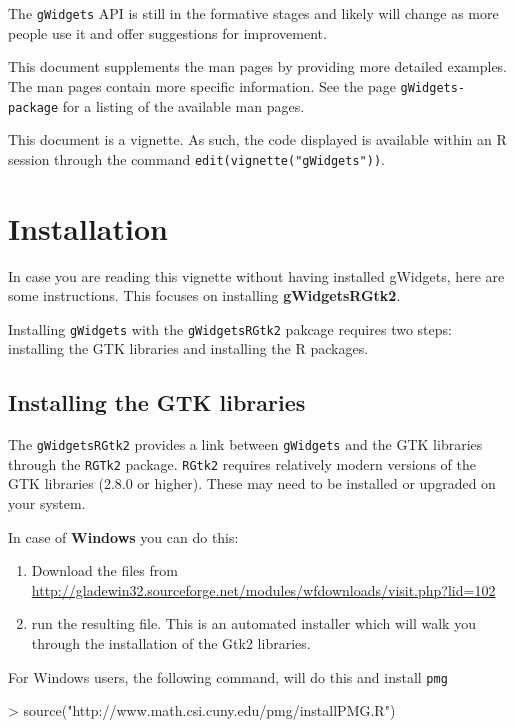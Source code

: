 \documentclass[12pt]{article}
\newcommand{\RCode}[1]{\texttt{#1}}
\newcommand{\RPackage}[1]{\textbf{#1}}
\begin{document}
The \RCode{gWidgets} API is still in the formative stages and likely will
change as more people use it and offer suggestions for improvement.

This document supplements the man pages by providing more detailed
examples. The man pages contain more specific information. See the 
page \RCode{gWidgets-package} for a listing of the available man pages.

This document is a vignette. As such, the code displayed is available
within an R session through the command
\RCode{edit(vignette("gWidgets"))}. 

\section{Installation}
In case you are reading this vignette without having installed
gWidgets, here are some instructions. This focuses on installing
\RPackage{gWidgetsRGtk2}. 

Installing \RCode{gWidgets} with the \RCode{gWidgetsRGtk2} pakcage
requires two steps: installing the GTK libraries and installing the R
packages.



\subsection{Installing the GTK libraries}

The \RCode{gWidgetsRGtk2} provides a link between \RCode{gWidgets} and
the GTK libraries through the \RCode{RGTk2} package.  \texttt{RGtk2}
requires relatively modern versions of the GTK libraries (2.8.0 or
higher). These may need to be installed or upgraded on your system.

In case of \textbf{Windows} you can do this:

\begin{enumerate}
\item 
 Download the files from
\href{http://gladewin32.sourceforge.net/modules/wfdownloads/visit.php?lid=102}{http://gladewin32.sourceforge.net/modules/wfdownloads/visit.php?lid=102}

\item run the resulting file.  This is an automated installer which will walk
you through the installation of the Gtk2 libraries.
\end{enumerate}

For Windows users, the following command, will do this and install
\RCode{pmg}
\begin{Sinput}
> source("http://www.math.csi.cuny.edu/pmg/installPMG.R")
\end{Sinput}
\end{document}
